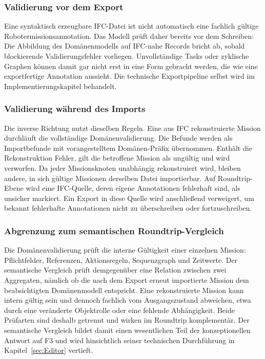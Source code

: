 \subsubsection{Validierung vor dem Export}
Eine syntaktisch erzeugbare IFC-Datei ist nicht automatisch eine fachlich gültige
Robotermissionsannotation. Das Modell prüft daher bereits vor dem Schreiben: Die Abbildung des
Domänenmodells auf IFC-nahe Records bricht ab, sobald blockierende Validierungsfehler vorliegen.
Unvollständige Tasks oder zyklische Graphen können damit gar nicht erst in eine Form gebracht
werden, die wie eine exportfertige Annotation aussieht. Die technische Exportpipeline selbst wird im
Implementierungskapitel behandelt.

\subsubsection{Validierung während des  Imports}
Die inverse Richtung nutzt dieselben Regeln. Eine aus IFC rekonstruierte Mission durchläuft die
vollständige Domänenvalidierung. Die Befunde werden als Importbefunde mit vorangestelltem
Domänen-Präfix übernommen. Enthält die Rekonstruktion Fehler, gilt die betroffene Mission als
ungültig und wird verworfen. Da jeder Missionsknoten unabhängig rekonstruiert wird, bleiben andere,
in sich gültige Missionen derselben Datei importierbar. Auf Roundtrip-Ebene wird eine IFC-Quelle,
deren eigene Annotationen fehlerhaft sind, als unsicher markiert. Ein Export in diese Quelle wird
anschließend verweigert, um bekannt fehlerhafte Annotationen nicht zu überschreiben oder
fortzuschreiben.

\subsubsection{Abgrenzung zum semantischen Roundtrip-Vergleich}
Die Domänenvalidierung prüft die interne Gültigkeit einer einzelnen Mission: Pflichtfelder,
Referenzen, Aktionsregeln, Sequenzgraph und Zeitwerte. Der semantische Vergleich prüft demgegenüber
eine Relation zwischen zwei Aggregaten, nämlich ob die nach dem Export erneut importierte Mission
dem beabsichtigten Domänenmodell entspricht. Eine rekonstruierte Mission kann intern gültig sein und
dennoch fachlich vom Ausgangszustand abweichen, etwa durch eine veränderte Objektrolle oder eine
fehlende Abhängigkeit. Beide Prüfarten sind deshalb getrennt und wirken im Roundtrip komplementär.
Der semantische Vergleich bildet damit einen wesentlichen Teil der konzeptionellen Antwort auf F3
und wird hinsichtlich seiner technischen Durchführung in Kapitel~\ref{sec:Editor} vertieft.
